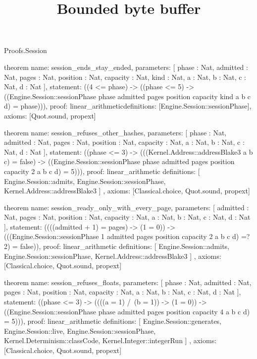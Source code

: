 \begin{lexlean}{Proofs.Session}
\title{Bounded byte buffer}
\begin{semanticmodule}
theorem{
  name: session_ends_stay_ended,
  parameters: [
    phase : Nat,
    admitted : Nat,
    pages : Nat,
    position : Nat,
    capacity : Nat,
    kind : Nat,
    a : Nat,
    b : Nat,
    c : Nat,
    d : Nat
  ],
  statement: ((4 <= phase) -> ((phase <= 5) -> ((Engine.Session::sessionPhase phase admitted pages position capacity kind a b c d) = phase))),
  proof: linear_arithmetic{definitions: [Engine.Session::sessionPhase]},
  axioms: [Quot.sound, propext]
}

theorem{
  name: session_refuses_other_hashes,
  parameters: [
    phase : Nat,
    admitted : Nat,
    pages : Nat,
    position : Nat,
    capacity : Nat,
    a : Nat,
    b : Nat,
    c : Nat,
    d : Nat
  ],
  statement: ((phase <= 3) -> (((Kernel.Address::addressBlake3 a b c) = false) -> ((Engine.Session::sessionPhase phase admitted pages position capacity 2 a b c d) = 5))),
  proof: linear_arithmetic{
    definitions: [
      Engine.Session::admits,
      Engine.Session::sessionPhase,
      Kernel.Address::addressBlake3
    ]
  },
  axioms: [Classical.choice, Quot.sound, propext]
}

theorem{
  name: session_ready_only_with_every_page,
  parameters: [
    admitted : Nat,
    pages : Nat,
    position : Nat,
    capacity : Nat,
    a : Nat,
    b : Nat,
    c : Nat,
    d : Nat
  ],
  statement: ((((admitted + 1) = pages) -> (1 = 0)) -> (((Engine.Session::sessionPhase 1 admitted pages position capacity 2 a b c d) =? 2) = false)),
  proof: linear_arithmetic{
    definitions: [
      Engine.Session::admits,
      Engine.Session::sessionPhase,
      Kernel.Address::addressBlake3
    ]
  },
  axioms: [Classical.choice, Quot.sound, propext]
}

theorem{
  name: session_refuses_floats,
  parameters: [
    phase : Nat,
    admitted : Nat,
    pages : Nat,
    position : Nat,
    capacity : Nat,
    a : Nat,
    b : Nat,
    c : Nat,
    d : Nat
  ],
  statement: ((phase <= 3) -> ((((a = 1) /\ (b = 1)) -> (1 = 0)) -> ((Engine.Session::sessionPhase phase admitted pages position capacity 4 a b c d) = 5))),
  proof: linear_arithmetic{
    definitions: [
      Engine.Session::generates,
      Engine.Session::live,
      Engine.Session::sessionPhase,
      Kernel.Determinism::classCode,
      Kernel.Integer::integerRun
    ]
  },
  axioms: [Classical.choice, Quot.sound, propext]
}


\end{semanticmodule}
\end{lexlean}

